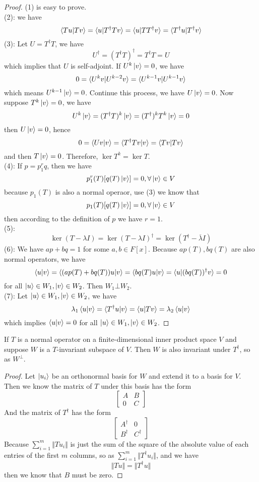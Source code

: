\documentclass{article}
\begin{document}
\begin{proof}
	(1) is easy to prove.\\
	(2): we have
	\[\braket{Tu|Tv}=\braket{u|T^\dagger Tv}=\braket{u|TT^\dagger v}=\braket{T^\dagger u|T^\dagger v}\]
	(3): Let $U=T^\dagger T$, we have
	\[U^\dagger=(T^\dagger T)^\dagger=T^\dagger T=U\]
	which implies that $U$ is self-adjoint. If $U^k\ket{v}=0$, we have
	\[0=\braket{U^kv|U^{k-2}v}=\braket{U^{k-1}v|U^{k-1}v}\]
	which means $U^{k-1}\ket{v}=0$. Continue this process, we have $U\ket{v}=0$. Now suppose $T^k\ket{v}=0$, we have
	\[U^k\ket{v}=(T^\dagger T)^k\ket{v}=(T^{\dagger})^kT^k\ket{v}=0\]
	then $U\ket{v}=0$, hence
	\[0=\braket{Uv|v}=\braket{T^\dagger Tv|v}=\braket{Tv|Tv}\]
	and then $T\ket{v}=0$. Therefore, $\ker T^k=\ker T$.\\
	(4): If $p=p_1^rq$, then we have
	\[p_1^r(T)[q(T)\ket{v}]=0,\forall\ket{v}\in V\]
	because $p_1(T)$ is also a normal operaor, use (3) we know that
	\[p_1(T)[q(T)\ket{v}]=0,\forall \ket{v}\in V\]
	then according to the definition of $p$ we have $r=1$.\\
	(5): \[\ker(T-\lambda I)=\ker(T-\lambda I)^\dagger=\ker(T^\dagger-\overline{\lambda}I)\]
	(6): We have $ap+bq=1$ for some $a,b\in F[x]$. Because $ap(T),bq(T)$ are also normal operators, we have
	\[\braket{u|v}=\braket{(ap(T)+bq(T))u|v}=\braket{bq(T)u|v}=\braket{u|(bq(T))^\dagger v}=0\]
	for all $\ket{u}\in W_1,\ket{v}\in W_2$. Then $W_1\bot W_2$.\\
	(7): Let $\ket{u}\in W_1,\ket{v}\in W_2$, we have
	\[\lambda_1\braket{u|v}=\braket{T^\dagger u|v}=\braket{u|Tv}=\lambda_2\braket{u|v}\]
	which implies $\braket{u|v}=0$ for all $\ket{u}\in W_1,\ket{v}\in W_2$.
\end{proof}
\begin{coro}
	If $T$ is a normal operator on a finite-dimensional inner product space $V$ and suppose $W$ is a $T$-invariant subspace of $V$. Then $W$ is also invariant under $T^\dagger$, so as $W^\bot$.
\end{coro}
\begin{proof}
	Let $\ket{u_i}$ be an orthonormal basis for $W$ and extend it to a basis for $V$. Then we know the matrix of $T$ under this basis has the form
	\[\begin{bmatrix}
		A&B\\
		0&C
	\end{bmatrix}\]
	And the matrix of $T^\dagger$ has the form
	\[\begin{bmatrix}
		A^\dagger&0\\
		B^\dagger&C^\dagger
	\end{bmatrix}\]
	Because $\sum\limits_{i=1}^m\Vert Tu_i\Vert$ is just the sum of the square of the absolute value of each entries of the first $m$ columns, so as $\sum\limits_{i=1}^m\Vert T^\dagger u_i\Vert$, and we have
	\[\Vert Tu\Vert=\Vert T^\dagger u\Vert\]
	then we know that $B$ must be zero.
\end{proof}
\end{document}
